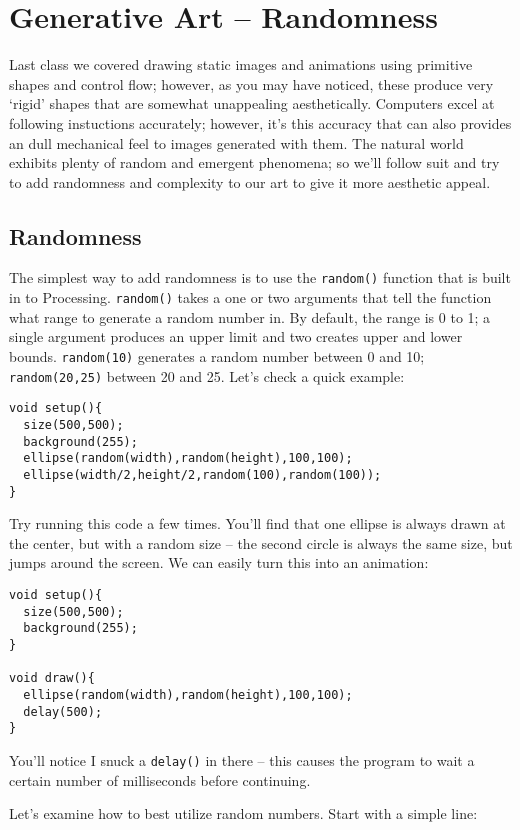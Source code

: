 \section{Generative Art -- Randomness}
Last class we covered drawing static images and animations using primitive shapes and control flow; however, as you may have noticed, these produce very `rigid' shapes that are somewhat unappealing aesthetically.  Computers excel at following instuctions accurately; however, it's this accuracy that can also provides an dull mechanical feel to images generated with them.  The natural world exhibits plenty of random and emergent phenomena; so we'll follow suit and try to add randomness and complexity to our art to give it more aesthetic appeal.

\subsection{Randomness}
The simplest way to add randomness is to use the \texttt{random()} function that is built in to Processing.  \texttt{random()} takes a one or two arguments that tell the function what range to generate a random number in.  By default, the range is 0 to 1; a single argument produces an upper limit and two creates upper and lower bounds.  \texttt{random(10)} generates a random number between 0 and 10; \texttt{random(20,25)} between 20 and 25.  Let's check a quick example:

\begin{verbatim}
void setup(){
  size(500,500);
  background(255);
  ellipse(random(width),random(height),100,100);
  ellipse(width/2,height/2,random(100),random(100));
}
\end{verbatim}

Try running this code a few times.  You'll find that one ellipse is always drawn at the center, but with a random size -- the second circle is always the same size, but jumps around the screen.  We can easily turn this into an animation:

\begin{verbatim}
void setup(){
  size(500,500);
  background(255);
}

void draw(){
  ellipse(random(width),random(height),100,100);
  delay(500);
}
\end{verbatim}

You'll notice I snuck a \texttt{delay()} in there -- this causes the program to wait a certain number of milliseconds before continuing.

Let's examine how to best utilize random numbers.  Start with a simple line:

